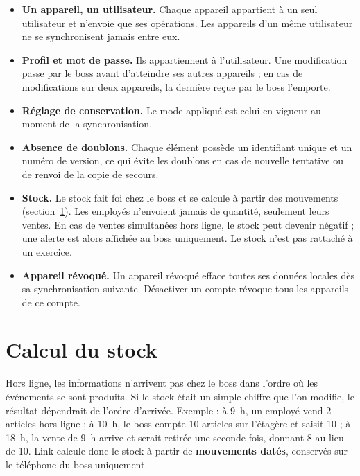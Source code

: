 \documentclass[11pt,a4paper]{article}
\begin{document}
\begin{itemize}[leftmargin=*]
		\item \textbf{Un appareil, un utilisateur.} Chaque appareil appartient à un seul utilisateur et n'envoie que ses opérations. Les appareils d'un même utilisateur ne se synchronisent jamais entre eux.
		\item \textbf{Profil et mot de passe.} Ils appartiennent à l'utilisateur. Une modification passe par le boss avant d'atteindre ses autres appareils ; en cas de modifications sur deux appareils, la dernière reçue par le boss l'emporte.
		\item \textbf{Réglage de conservation.} Le mode appliqué est celui en vigueur au moment de la synchronisation.
		\item \textbf{Absence de doublons.} Chaque élément possède un identifiant unique et un numéro de version, ce qui évite les doublons en cas de nouvelle tentative ou de renvoi de la copie de secours.
		\item \textbf{Stock.} Le stock fait foi chez le boss et se calcule à partir des mouvements (section~\ref{sec:stock}). Les employés n'envoient jamais de quantité, seulement leurs ventes. En cas de ventes simultanées hors ligne, le stock peut devenir négatif ; une alerte est alors affichée au boss uniquement. Le stock n'est pas rattaché à un exercice.
		\item \textbf{Appareil révoqué.} Un appareil révoqué efface toutes ses données locales dès sa synchronisation suivante. Désactiver un compte révoque tous les appareils de ce compte.
	\end{itemize}

	\section{Calcul du stock}\label{sec:stock}
	Hors ligne, les informations n'arrivent pas chez le boss dans l'ordre où les événements se sont produits. Si le stock était un simple chiffre que l'on modifie, le résultat dépendrait de l'ordre d'arrivée. Exemple : à 9~h, un employé vend 2 articles hors ligne ; à 10~h, le boss compte 10 articles sur l'étagère et saisit 10 ; à 18~h, la vente de 9~h arrive et serait retirée une seconde fois, donnant 8 au lieu de 10. Link calcule donc le stock à partir de \textbf{mouvements datés}, conservés sur le téléphone du boss uniquement.
\end{document}
